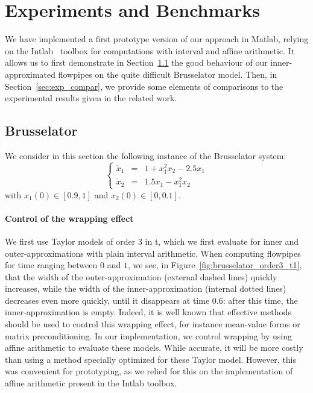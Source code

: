 \documentclass{sig-alternate-05-2015} %
\begin{document}
\section{Experiments and Benchmarks}
\label{sec:experiments}
We have implemented a first prototype version of our approach in Matlab, relying on the Intlab~\cite{Ru99a} 
toolbox for computations with interval and affine arithmetic.
It allows us to first demonstrate in Section~\ref{sec:exp_bruss} the good behaviour of our inner-approximated flowpipes
 on the quite difficult Brusselator model. %
Then, in Section~\ref{sec:exp_compar}, we provide some elements of comparisons to the experimental results 
given in the related work. 
 
\subsection{Brusselator}
\label{sec:exp_bruss}

We consider in this section the following instance of the Brusselator system: 
$$\left\{\begin{array}{rcl}
\dot{x}_1 & = & 1+x_1^2x_2-2.5x_1 \\
\dot{x}_2 & = & 1.5x_1-x_1^2x_2
\end{array}\right.$$
\noindent with $x_1(0) \in [0.9,1]$ and $x_2(0) \in [0,0.1]$.

\paragraph{Control of the wrapping effect}
We first use Taylor models of order 3 in t, which we first evaluate for inner and outer-approximations 
with plain interval arithmetic. When computing flowpipes for time ranging between $0$ and $1$, 
we see, in Figure~\ref{fig:brusselator_order3_t1}, that the width of the outer-approximation 
(external dashed lines) quickly increases, while the 
width of the inner-approximation (internal dotted lines) decreases even more quickly, 
until it disappears at time 0.6: after this time, the inner-approximation is empty. Indeed, it is well 
known that effective methods should be used to control this wrapping effect, for instance mean-value 
forms or matrix preconditioning. In our implementation, we control wrapping by using 
affine arithmetic to evaluate these models. While accurate, it will be more costly than using 
a method specially optimized for these Taylor model. However, this was convenient for prototyping, 
as we relied for this on the implementation of affine arithmetic present in the Intlab 
toolbox.
 
\end{document}
